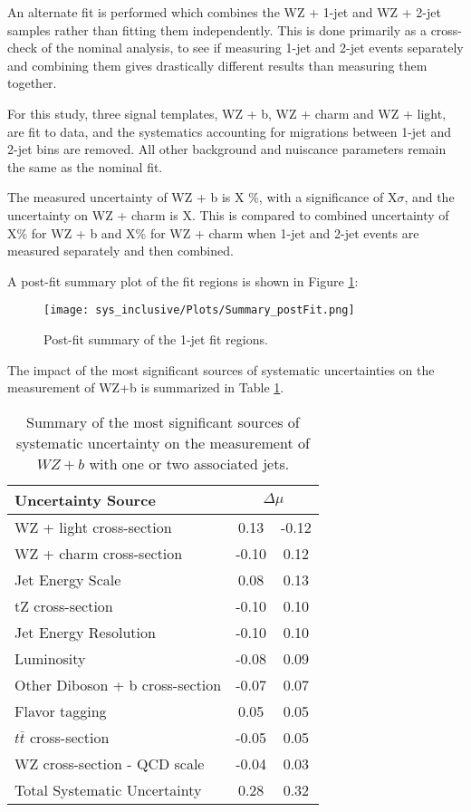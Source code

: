 
An alternate fit is performed which combines the WZ + 1-jet and WZ + 2-jet samples rather than fitting them independently. This is done primarily as a cross-check of the nominal analysis, to see if measuring 1-jet and 2-jet events separately and combining them gives drastically different results than measuring them together. 

For this study, three signal templates, WZ + b, WZ + charm and WZ + light, are fit to data, and the systematics accounting for migrations between 1-jet and 2-jet bins are removed. All other background and nuiscance parameters remain the same as the nominal fit. 

The measured uncertainty of WZ + b is X \%, with a significance of X$\sigma$, and the uncertainty on WZ + charm is X. This is compared to combined uncertainty of X\% for WZ + b and X\% for WZ + charm when 1-jet and 2-jet events are measured separately and then combined.

A post-fit summary plot of the fit regions is shown in Figure \ref{fig:fit_results_inc}: 

\begin{figure}[H]
    \center
    \texttt{[image: sys\_inclusive/Plots/Summary\_postFit.png]}
    \caption{Post-fit summary of the 1-jet fit regions.}
    \label{fig:fit_results_inc}
\end{figure}

The impact of the most significant sources of systematic uncertainties on the measurement of WZ+b is summarized in Table \ref{tab:systematics_inc}. 

\begin{table}[H]
    \centering
    \begin{tabular}{l|cc}
        \hline\hline
        Uncertainty Source & \multicolumn{2}{c}{$\Delta \mu$ }  \\
        \hline
        WZ + light cross-section & 0.13 & -0.12 \\
        WZ + charm cross-section & -0.10 & 0.12 \\
        Jet Energy Scale & 0.08 & 0.13 \\
        tZ cross-section & -0.10 & 0.10 \\
        Jet Energy Resolution & -0.10 & 0.10 \\
        Luminosity & -0.08 & 0.09 \\
        Other Diboson + b cross-section & -0.07 & 0.07 \\
        Flavor tagging & 0.05 & 0.05 \\
        $t\bar{t}$ cross-section & -0.05 & 0.05 \\
        WZ cross-section - QCD scale & -0.04 & 0.03 \\
        \hline
        Total Systematic Uncertainty & 0.28 & 0.32 \\
        
        \hline\hline
    \end{tabular}
    \caption{Summary of the most significant sources of systematic uncertainty on the measurement of $WZ+b$ with one or two associated jets.}
    \label{tab:systematics_inc}
\end{table}

